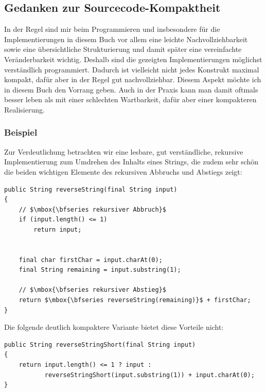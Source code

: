 \subsection{Gedanken zur Sourcecode-Kompaktheit}


In der Regel sind  mir  beim Programmieren und insbesondere für die
Implementierungen in diesem Buch vor allem eine leichte Nachvollziehbarkeit sowie
 eine übersicht\-liche Strukturierung und damit  später eine vereinfachte
  Veränderbarkeit wichtig. Deshalb sind die gezeigten Implementierungen
 möglichst verständlich programmiert.
 Dadurch ist vielleicht  nicht jedes Konstrukt maximal kompakt, dafür aber in
 der Regel  gut nachvollziehbar. Diesem Aspekt möchte ich in diesem
 Buch den Vorrang geben. Auch in der Praxis  kann man damit oftmals besser
 leben als mit einer schlechten Wartbarkeit, dafür aber einer kompakteren
 Realisierung.




\subsubsection{Beispiel}


Zur Verdeutlichung betrachten wir eine lesbare, gut verständliche,
rekursive Implementierung zum Umdrehen des Inhalts eines Strings, die zudem sehr schön die
beiden wichtigen Elemente des rekursiven Abbruchs und Abstiegs zeigt:


\lstset{mathescape=true}
\vspace{-0.85mm}
\begin{lstlisting}
public String reverseString(final String input)
{
    // $\mbox{\bfseries rekursiver Abbruch}$
    if (input.length() <= 1)
        return input;


    final char firstChar = input.charAt(0);
    final String remaining = input.substring(1);

    // $\mbox{\bfseries rekursiver Abstieg}$
    return $\mbox{\bfseries reverseString(remaining)}$ + firstChar;
}
\end{lstlisting}
\vspace{-0.85mm}
\lstset{mathescape=false}


\noindent
Die folgende deutlich kompaktere Variante bietet diese
Vorteile nicht:


\lstset{mathescape=true}
\vspace{-0.85mm}
\begin{lstlisting}
public String reverseStringShort(final String input)
{
    return input.length() <= 1 ? input :
           reverseStringShort(input.substring(1)) + input.charAt(0);
}
\end{lstlisting}
\vspace{-0.85mm}
\lstset{mathescape=false}


